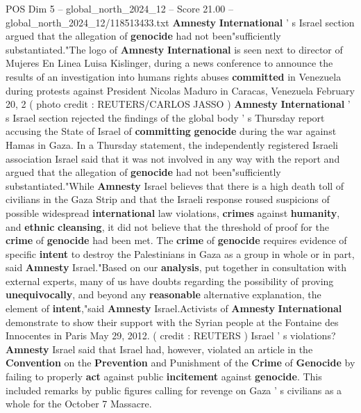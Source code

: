 \begin{textsample}{POS Dim 5 – global\_north\_2024\_12 – Score 21.00 – global\_north\_2024\_12/118513433.txt}  \label{ex:f5_pos_093}
\textbf{Amnesty} \textbf{International} ' s Israel section argued that the allegation of \textbf{genocide} had not been"sufficiently substantiated."The logo of \textbf{Amnesty} \textbf{International} is seen next to director of Mujeres En Linea Luisa Kislinger, during a news conference to announce the results of an investigation into humans rights abuses \textbf{committed} in Venezuela during protests against President Nicolas Maduro in Caracas, Venezuela February 20, 2 ( photo credit : REUTERS/CARLOS JASSO ) \textbf{Amnesty} \textbf{International} ' s Israel section rejected the findings of the global body ' s Thursday report accusing the State of Israel of \textbf{committing} \textbf{genocide} during the war against Hamas in Gaza.
In a Thursday statement, the independently registered Israeli association Israel said that it was not involved in any way with the report and argued that the allegation of \textbf{genocide} had not been"sufficiently substantiated."While \textbf{Amnesty} Israel believes that there is a high death toll of civilians in the Gaza Strip and that the Israeli response roused suspicions of possible widespread \textbf{international} law violations, \textbf{crimes} against \textbf{humanity}, and \textbf{ethnic} \textbf{cleansing}, it did not believe that the threshold of proof for the \textbf{crime} of \textbf{genocide} had been met.
The \textbf{crime} of \textbf{genocide} requires evidence of specific \textbf{intent} to destroy the Palestinians in Gaza as a group in whole or in part, said \textbf{Amnesty} Israel."Based on our \textbf{analysis}, put together in consultation with external experts, many of us have doubts regarding the possibility of proving \textbf{unequivocally}, and beyond any \textbf{reasonable} alternative explanation, the element of \textbf{intent},"said \textbf{Amnesty} Israel.Activists of \textbf{Amnesty} \textbf{International} demonstrate to show their support with the Syrian people at the Fontaine des Innocentes in Paris May 29, 2012. ( credit : REUTERS ) Israel ' s violations? \textbf{Amnesty} Israel said that Israel had, however, violated an article in the \textbf{Convention} on the \textbf{Prevention} and Punishment of the \textbf{Crime} of \textbf{Genocide} by failing to properly \textbf{act} against public \textbf{incitement} against \textbf{genocide}.
This included remarks by public figures calling for revenge on Gaza ' s civilians as a whole for the October 7 Massacre.

\end{textsample}
